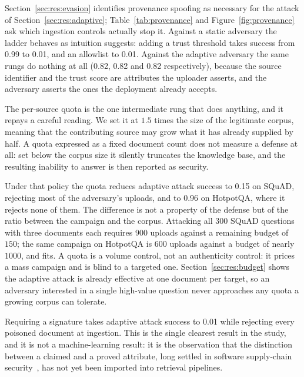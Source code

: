 \documentclass[information,article,submit,moreauthors]{Definitions/mdpi}
\newcommand{\provQuotaAdaptiveHotpot}{0.96}
\newcommand{\provOpenStatic}{0.99}
\newcommand{\provOpenAdaptive}{0.82}
\newcommand{\provTrustonlyStatic}{0.01}
\newcommand{\provTrustonlyAdaptive}{0.82}
\newcommand{\provAllowlistStatic}{0.01}
\newcommand{\provAllowlistAdaptive}{0.82}
\newcommand{\provQuotaAdaptive}{0.15}
\newcommand{\provSignedAdaptive}{0.01}
\begin{document}
Section~\ref{sec:res:evasion} identifies provenance spoofing as necessary for the attack of
Section~\ref{sec:res:adaptive}; Table~\ref{tab:provenance} and Figure~\ref{fig:provenance} ask which ingestion controls
actually stop it. Against a static adversary the ladder behaves as intuition suggests: adding a
trust threshold takes success from \provOpenStatic{} to \provTrustonlyStatic{}, and an
allowlist to \provAllowlistStatic{}. Against the adaptive adversary the same rungs do nothing
at all (\provOpenAdaptive{}, \provTrustonlyAdaptive{} and \provAllowlistAdaptive{}
respectively), because the source identifier and the trust score are attributes the uploader
asserts, and the
adversary asserts the ones the deployment already accepts.

The per-source quota is the one intermediate rung that does anything, and it repays a careful
reading. We set it at $1.5$ times the size of the legitimate corpus, meaning that the
contributing source may grow what it has already supplied by half. A quota expressed as a fixed
document count does not measure a defense at all: set below the corpus size it silently
truncates the knowledge base, and the resulting inability to answer is then reported as
security.

Under that policy the quota reduces adaptive attack success to \provQuotaAdaptive{} on SQuAD,
rejecting most of the adversary's uploads, and to \provQuotaAdaptiveHotpot{} on HotpotQA, where
it rejects none of them. The difference is not a property of the defense but of the ratio
between the campaign and the corpus. Attacking all $300$ SQuAD questions with three documents
each requires $900$ uploads against a remaining budget of $150$; the same campaign on HotpotQA
is $600$ uploads against a budget of nearly $1000$, and fits. A quota is a volume control, not
an authenticity control: it prices a mass campaign and is blind to a targeted one.
Section~\ref{sec:res:budget} shows the adaptive attack is already effective at one document per
target, so an adversary interested in a single high-value question never approaches any quota a
growing corpus can tolerate.

Requiring a signature takes adaptive attack success to \provSignedAdaptive{} while rejecting
every poisoned document at ingestion. This is the single clearest result in the study, and it
is not a machine-learning result: it is the observation that the distinction between a claimed
and a proved attribute, long settled in software supply-chain
security~\citep{torresarias2019intoto,newman2022sigstore,nist2022ssdf}, has not yet been
imported into retrieval pipelines.
\end{document}
